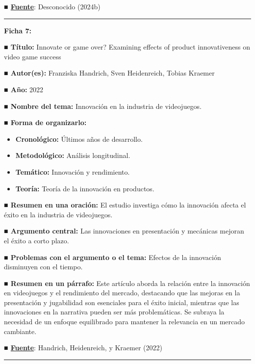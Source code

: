 \documentclass[
  letterpaper,
  DIV=11,
  numbers=noendperiod]{scrreprt}
\begin{document}
\textbf{■
\href{https://bdigital.uncu.edu.ar/objetos_digitales/15654/plan-de-marketing-para-una-empresa-de-videojuegos.pdf}{Fuente}}:
Desconocido (2024b)

\begin{center}\rule{0.5\linewidth}{0.5pt}\end{center}

\textbf{Ficha 7:}

\textbf{■ Título:} Innovate or game over? Examining effects of product
innovativeness on video game success

\textbf{■ Autor(es):} Franziska Handrich, Sven Heidenreich, Tobias
Kraemer

\textbf{■ Año:} 2022

\textbf{■ Nombre del tema:} Innovación en la industria de videojuegos.

\textbf{■ Forma de organizarlo:}

\begin{itemize}
\item
  \textbf{Cronológico:} Últimos años de desarrollo.
\item
  \textbf{Metodológico:} Análisis longitudinal.
\item
  \textbf{Temático:} Innovación y rendimiento.
\item
  \textbf{Teoría:} Teoría de la innovación en productos.
\end{itemize}

\textbf{■ Resumen en una oración:} El estudio investiga cómo la
innovación afecta el éxito en la industria de videojuegos.

\textbf{■ Argumento central:} Las innovaciones en presentación y
mecánicas mejoran el éxito a corto plazo.

\textbf{■ Problemas con el argumento o el tema:} Efectos de la
innovación disminuyen con el tiempo.

\textbf{■ Resumen en un párrafo:} Este artículo aborda la relación entre
la innovación en videojuegos y el rendimiento del mercado, destacando
que las mejoras en la presentación y jugabilidad son esenciales para el
éxito inicial, mientras que las innovaciones en la narrativa pueden ser
más problemáticas. Se subraya la necesidad de un enfoque equilibrado
para mantener la relevancia en un mercado cambiante.

\textbf{■ \href{https://doi.org/10.1007/s12525-022-00521-7}{Fuente}}:
Handrich, Heidenreich, y Kraemer (2022)

\begin{center}\rule{0.5\linewidth}{0.5pt}\end{center}
\end{document}
